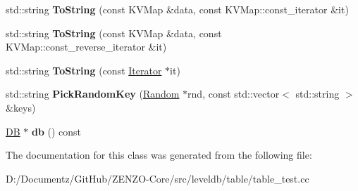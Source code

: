 \begin{DoxyCompactItemize}
std\+::string {\bfseries To\+String} (const K\+V\+Map \&data, const K\+V\+Map\+::const\+\_\+iterator \&it)
\item 
\mbox{\label{classleveldb_1_1_harness_a7589308a4592b9edb4142825b743244c}} 
std\+::string {\bfseries To\+String} (const K\+V\+Map \&data, const K\+V\+Map\+::const\+\_\+reverse\+\_\+iterator \&it)
\item 
\mbox{\label{classleveldb_1_1_harness_a1cdf351918a2e969bce1c29290317403}} 
std\+::string {\bfseries To\+String} (const \mbox{\hyperlink{classleveldb_1_1_iterator}{Iterator}} $\ast$it)
\item 
\mbox{\label{classleveldb_1_1_harness_ab6f2d80f97eb56fc65d4a9177cd86c03}} 
std\+::string {\bfseries Pick\+Random\+Key} (\mbox{\hyperlink{classleveldb_1_1_random}{Random}} $\ast$rnd, const std\+::vector$<$ std\+::string $>$ \&keys)
\item 
\mbox{\label{classleveldb_1_1_harness_ab370dc0e64bbb01d47af4e624441fde4}} 
\mbox{\hyperlink{classleveldb_1_1_d_b}{DB}} $\ast$ {\bfseries db} () const
\end{DoxyCompactItemize}


The documentation for this class was generated from the following file\+:\begin{DoxyCompactItemize}
\item 
D\+:/\+Documentz/\+Git\+Hub/\+Z\+E\+N\+Z\+O-\/\+Core/src/leveldb/table/table\+\_\+test.\+cc\end{DoxyCompactItemize}

